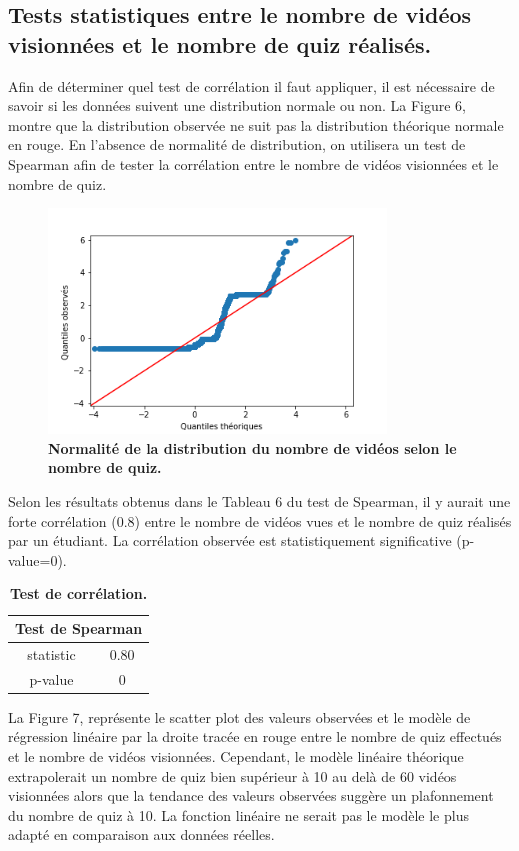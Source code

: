 \documentclass[12pt, a4paper, titlepage, table]{article}
\begin{document}
\subsection{Tests statistiques entre le nombre de vidéos visionnées et le nombre de quiz réalisés.}
Afin de déterminer quel test de corrélation il faut appliquer, il est nécessaire de savoir si les données suivent une distribution normale ou non. La Figure 6, montre que la distribution observée ne suit pas la distribution théorique normale en rouge.
En l'absence de normalité de distribution, on utilisera un test de Spearman afin de tester la corrélation entre le nombre de vidéos visionnées et le nombre de quiz. 

\begin{figure}[H]
	\centering
	\includegraphics[width=0.8\textwidth]{../../graph/distribution_video4.png}
	\caption{\textbf{Normalité de la distribution du nombre de vidéos selon le nombre de quiz.}}
\end{figure}

Selon les résultats obtenus dans le Tableau 6 du test de Spearman, il y aurait une forte corrélation (0.8) entre le nombre de vidéos vues et le nombre de quiz réalisés par un étudiant. La corrélation observée est statistiquement significative (p-value=0).
\begin{table}[H]
	\centering
	\fontsize{12}{20}\selectfont
	\begin{tabular}{|c|c|}
		\hline
		\multicolumn{2}{|c|}{\textbf{Test de Spearman}}\\ 
		\hline 
		statistic& 0.80\\
		p-value& 0\\
		\hline
	\end{tabular}
	\caption{\textbf{Test de corrélation.}}
\end{table}

La Figure 7, représente le scatter plot des valeurs observées et le modèle de régression linéaire par la droite tracée en rouge entre le nombre de quiz effectués et le nombre de vidéos visionnées. Cependant, le modèle linéaire théorique extrapolerait un nombre de quiz bien supérieur à 10 au delà de 60 vidéos visionnées alors que la tendance des valeurs observées suggère un plafonnement du nombre de quiz à 10. La fonction linéaire ne serait pas le modèle le plus adapté en comparaison aux données réelles.
\end{document}
